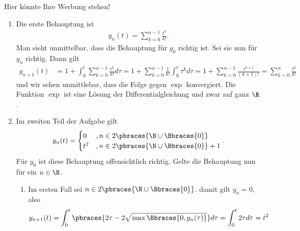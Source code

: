 \begin{solution}
    Hier könnte Ihre Werbung stehen!
    \begin{enumerate}[label = \alph*)]
        \item Die erste Behauptung ist
        \begin{align*}
        y_n(t) = \sum_{k = 0}^{n-1} \frac{t^k}{k!} .
        \end{align*}
        Man sieht unmittelbar, dass die Behauptung für $y_0$ richtig ist. Sei sie nun für $y_n$ richtig.
        Dann gilt
        \begin{align*}
            y_{n+1}(t) &= 1 + \int_0^t \sum_{k = 0}^{n-1} \frac{\tau^k}{k!} d\tau = 1 +  \sum_{k = 0}^{n-1}\frac{1}{k!} \int_0^t \tau^k d\tau = 1 + \sum_{k = 0}^{n-1} \frac{\tau^{k + 1}}{(k+1)!} = \sum_{k = 0}^n \frac{\tau^k}{k!}
        \end{align*}
        und wir sehen unmittlebar, dass die Folge gegen $\exp$ konvergiert. Die Funktion $\exp$ ist eine Lösung der Differentialgleichung und zwar auf ganz $\R$.

        \item Im zweiten Teil der Aufgabe gilt
        \begin{align*}
            y_n(t) = 
            \begin{cases}
                0 &, n \in 2 \pbraces{\N \cup \Bbraces{0}} \\
                t^2 &, n \in 2 \pbraces{\N \cup \Bbraces{0}} + 1
            \end{cases} .
        \end{align*}
        Für $y_0$ ist diese Behauptung offensichtlich richtig. Gelte die Behauptung nun für ein $n \in \N$.
        \begin{enumerate}[label = \roman*)]
            \item Im ersten Fall sei $n \in 2 \pbraces{\N \cup \Bbraces{0}}$. damit gilt $y_n = 0$, also 
            \begin{align*}
                y_{n+1}(t) = \int_0^t \pbraces{2\tau - 2 \sqrt{\max\Bbraces{0, y_n(\tau)}}} d\tau = \int_0^t 2\tau d\tau = t^2
            \end{align*}


\end{enumerate}
\end{enumerate}
\end{solution}
